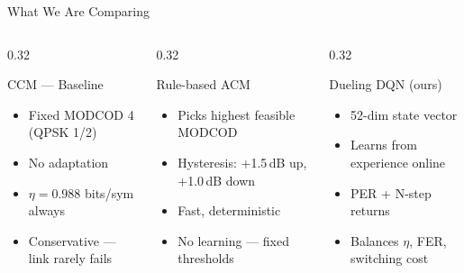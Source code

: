 \documentclass[aspectratio=169,10pt]{beamer}
\begin{document}
\begin{frame}{What We Are Comparing}
\begin{columns}[T]
  \begin{column}{0.32\textwidth}
    \begin{block}{CCM — Baseline}
      \begin{itemize}\small
        \item Fixed MODCOD 4\\(QPSK 1/2)
        \item No adaptation
        \item $\eta = 0.988$ bits/sym always
        \item Conservative — link rarely fails
      \end{itemize}
    \end{block}
  \end{column}
  \begin{column}{0.32\textwidth}
    \begin{block}{Rule-based ACM}
      \begin{itemize}\small
        \item Picks highest feasible MODCOD
        \item Hysteresis: +1.5\,dB up, +1.0\,dB down
        \item Fast, deterministic
        \item No learning — fixed thresholds
      \end{itemize}
    \end{block}
  \end{column}
  \begin{column}{0.32\textwidth}
    \begin{alertblock}{Dueling DQN (ours)}
      \begin{itemize}\small
        \item 52-dim state vector
        \item Learns from experience online
        \item PER + N-step returns
        \item Balances $\eta$, FER, switching cost
      \end{itemize}
    \end{alertblock}
  \end{column}
\end{columns}


\end{frame}
\end{document}
